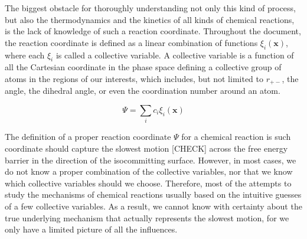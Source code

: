 \begin{spacing}{2.0}
    The biggest obstacle for thoroughly understanding not only this kind of process, but also the thermodynamics and the kinetics of all kinds of 
    chemical reactions, is the lack of knowledge of such a reaction coordinate. Throughout the document, the reaction coordinate is defined as a 
    linear combination of functions $\xi_i(\mathbf{x})$, where each $\xi_i$ is called a collective variable. A collective variable is a function 
    of all the Cartesian coordinate in the phase space defining a collective group of atoms in the regions of our interests, which includes, but 
    not limited to $r_{+-}$, the angle, the dihedral angle, or even the coordination number around an atom.

    \begin{equation}
        \Psi = \sum_i c_i \xi_i(\mathbf{x})
    \end{equation}

    The definition of a proper reaction coordinate $\Psi$ for a chemical reaction is such coordinate should capture the slowest motion [CHECK] 
    across the free energy barrier in the direction of the isocommitting surface. However, in most cases, we do not know a proper combination of 
    the collective variables, nor that we know which collective variables should we choose. Therefore, most of the attempts to study the mechanisms 
    of chemical reactions usually based on the intuitive guesses of a few collective variables. As a result, we cannot know with certainty about 
    the true underlying mechanism that actually represents the slowest motion, for we only have a limited picture of all the influences.




\end{spacing}
